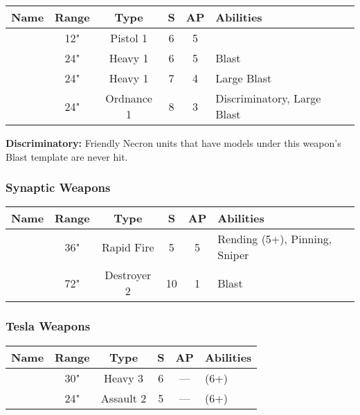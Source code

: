 \label{Particle Caster} \label{Particle Beamer} \label{Particle Shredder} \label{Particle Whip}
\noindent
\begin{NiceTabular}{m{130 pt} *{4}{c} >{\raggedright\arraybackslash}p{240pt}}
	Name & Range & Type & S & AP & Abilities \\
	\hline
	 & 12" & Pistol 1 & 6 & 5 & \\
	  & 24" & Heavy 1 & 6 & 5 & Blast \\
	 & 24" & Heavy 1 & 7 & 4 & Large Blast \\
	  & 24" & Ordnance 1 & 8 & 3 & Discriminatory, Large Blast \\
\end{NiceTabular}

\vspace*{1em}
\textbf{Discriminatory:} Friendly Necron units that have models under this weapon's Blast template are never hit.


\subsubsection{Synaptic Weapons}
\label{Synaptic Disintegrator}
\noindent
\begin{NiceTabular}{m{130 pt} *{4}{c} >{\raggedright\arraybackslash}p{240pt}}
	Name & Range & Type & S & AP & Abilities \\
	\hline
	 & 36" & Rapid Fire & 5 & 5 & Rending (5+), Pinning, Sniper \\	
	  & 72" & Destroyer 2 & 10 & 1 & Blast \\
\end{NiceTabular}

\subsubsection{Tesla Weapons}
\label{Tesla Cannon} \label{Tesla Carbine}
\noindent
\begin{NiceTabular}{m{130 pt} *{4}{c} >{\raggedright\arraybackslash}p{240pt}}
	Name & Range & Type & S & AP & Abilities \\
	\hline
	 & 30" & Heavy 3 & 6 & — &  (6+) \\
	  & 24" & Assault 2 & 5 & — &  (6+) \\	
\end{NiceTabular}


